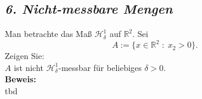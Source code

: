 \subsection*{\itshape 6. Nicht-messbare Mengen}

Man betrachte das Maß $\mathcal{H}_\delta^1$ auf $\mathbb{R}^2$. Sei
$$
    A := \{ x \in \mathbb{R}^2 \; : \; x_2 > 0 \}.
$$
Zeigen Sie:\\
$A$ ist nicht $\mathcal{H}_\delta^1$-messbar für beliebiges $\delta > 0$.\\

\textbf{Beweis:}\\

tbd

